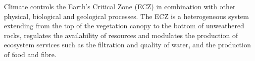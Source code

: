 \documentclass[authoryear,preprint,review,12pt]{elsarticle}
\begin{document}


Climate controls the Earth's Critical Zone (ECZ) in combination with other physical, biological and geological processes.
The ECZ is a heterogeneous system extending from the top of the vegetation canopy to the bottom of unweathered rocks, regulates the availability of resources and modulates the production of ecosystem services such as the filtration and quality of water, and the production of food and fibre.

\end{document}
